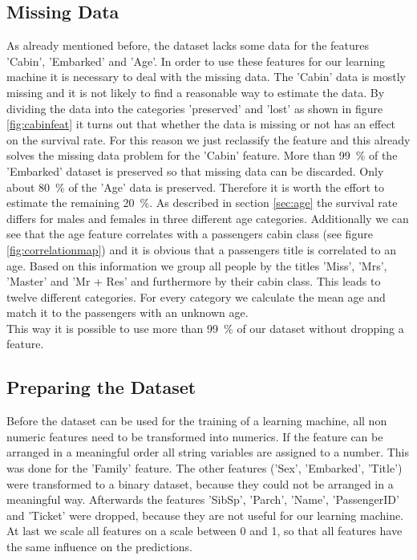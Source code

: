 \subsection{Missing Data}
As already mentioned before, the dataset lacks some data for the features 'Cabin', 'Embarked' and 'Age'. In order to use these features for our learning machine it is necessary to deal with the missing data. The 'Cabin' data is mostly missing and it is not likely to find a reasonable way to estimate the data. By dividing the data into the categories 'preserved' and 'lost' as shown in figure \ref{fig:cabinfeat} it turns out that whether the data is missing or not has an effect on the survival rate. For this reason we just reclassify the feature and this already solves the missing data problem for the 'Cabin' feature. More than \mbox{99 \%} of the 'Embarked' dataset is preserved so that missing data can be discarded. Only about \mbox{80 \%} of the 'Age' data is preserved. Therefore it is worth the effort to estimate the remaining \mbox{20 \%}. As described in section \ref{sec:age} the survival rate differs for males and females in three different age categories. Additionally we can see that the age feature correlates with a passengers cabin class (see figure \ref{fig:correlationmap}) and it is obvious that a passengers title is correlated to an age. Based on this information we group all people by the titles 'Miss', 'Mrs', 'Master' and 'Mr + Res' and  furthermore by their cabin class. This leads to twelve different categories. For every category we calculate the mean age and match it to the passengers with an unknown age.\\
This way it is possible to use more than \mbox{99 \%} of our dataset without dropping a feature.

\subsection{Preparing the Dataset}
Before the dataset can be used for the training of a learning machine, all non numeric features need to be transformed into numerics. If the feature can be arranged in a meaningful order all string variables are assigned to a number. This was done for the 'Family' feature. The other features ('Sex', 'Embarked', 'Title') were transformed to a binary dataset, because they could not be arranged in a meaningful way. Afterwards the features 'SibSp', 'Parch', 'Name', 'PassengerID' and 'Ticket' were dropped, because they are not useful for our learning machine. At last we scale all features on a scale between 0 and 1, so that all features have the same influence on the predictions.

